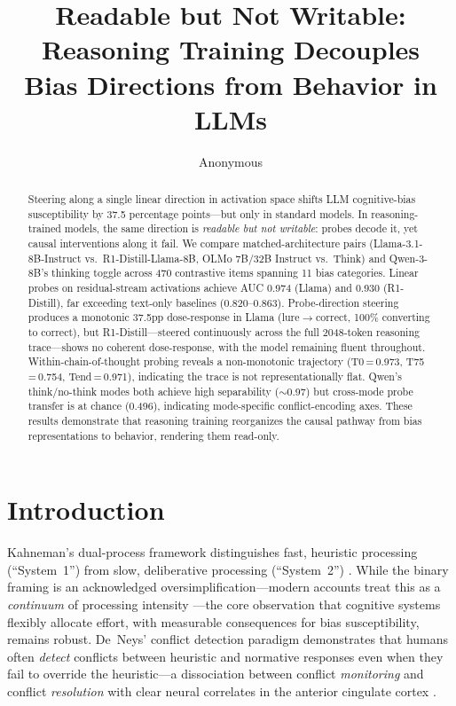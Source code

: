 \documentclass[twocolumn,10pt]{article}
\title{Readable but Not Writable: Reasoning Training Decouples\\
  Bias Directions from Behavior in LLMs}
\author{Anonymous}
\date{}
\begin{document}
\maketitle


\begin{abstract}
Steering along a single linear direction in activation space shifts
LLM cognitive-bias susceptibility by 37.5 percentage points---but only
in standard models.  In reasoning-trained models, the same direction is
\emph{readable but not writable}: probes decode it, yet causal
interventions along it fail.  We compare matched-architecture pairs
(Llama-3.1-8B-Instruct vs.\ R1-Distill-Llama-8B, OLMo 7B/32B
Instruct vs.\ Think) and Qwen-3-8B's thinking toggle across 470
contrastive items spanning 11 bias categories.  Linear probes on
residual-stream activations achieve AUC 0.974 (Llama) and 0.930
(R1-Distill), far exceeding text-only
baselines (0.820--0.863).  Probe-direction steering produces a monotonic
37.5pp dose-response in Llama (lure$\to$correct, 100\% converting to correct), but
R1-Distill---steered continuously across the full 2048-token reasoning
trace---shows no coherent dose-response, with the model remaining
fluent throughout.  Within-chain-of-thought probing reveals a
non-monotonic trajectory (T0\,=\,0.973, T75\,=\,0.754,
Tend\,=\,0.971), indicating the trace is not representationally flat.  Qwen's
think/no-think modes both achieve high separability (${\sim}$0.97) but
cross-mode probe transfer is at chance (0.496), indicating
mode-specific conflict-encoding axes.  These results demonstrate that
reasoning training reorganizes the causal pathway from bias
representations to behavior, rendering them read-only.
\end{abstract}


\section{Introduction}
\label{sec:intro}

Kahneman's dual-process framework distinguishes fast, heuristic
processing (``System~1'') from slow, deliberative processing
(``System~2'') \citep{kahneman2011thinking}.  While the binary framing
is an acknowledged oversimplification---modern accounts treat this as a
\emph{continuum} of processing intensity \citep{melnikoff2018mythical,
evans2013dual, deneys2023advancing}---the core observation that
cognitive systems flexibly allocate effort, with measurable consequences
for bias susceptibility, remains robust.  De~Neys' conflict
detection paradigm \citep{deneys2012bias, deneys2017dual} demonstrates
that humans often \emph{detect} conflicts between heuristic and
normative responses even when they fail to override the heuristic---a
dissociation between conflict \emph{monitoring} and conflict
\emph{resolution} with clear neural correlates in the anterior cingulate
cortex \citep{botvinick2001conflict}.
\end{document}
